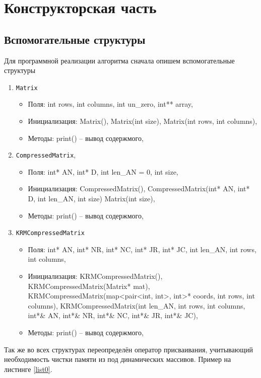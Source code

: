 \chapter{Конструкторская часть}

\section{Вспомогательные структуры} 
Для программной реализации алгоритма сначала опишем вспомогательные структуры
\begin{enumerate}
	\item \texttt{Matrix}
	\begin{itemize}
		\item Поля: int rows, int columns, int un\_zero, int** array,
		\item Инициализация: Matrix(), Matrix(int size), Matrix(int rows, int columns),
		\item Методы: print() -- вывод содержмого,
	\end{itemize}
	
	\item \texttt{CompressedMatrix},
	\begin{itemize}
		\item Поля: int* AN, int* D, int len\_AN = 0, int size,
		\item Инициализация: CompressedMatrix(), CompressedMatrix(int* AN, int* D, int len\_AN, int size) Matrix(int size),
		\item Методы: print() -- вывод содержмого,
	\end{itemize}
	
	\item \texttt{KRMCompressedMatrix}
	\begin{itemize}
		\item Поля: int* AN, int* NR, int* NC, int* JR, int* JC, int len\_AN, int rows, int columns,
		\item Инициализация: KRMCompressedMatrix(), KRMCompressedMatrix(Matrix* mat), KRMCompressedMatrix(map<pair<int, int>, int>* coords, int rows, int columns), KRMCompressedMatrix(int len\_AN, int rows, int columns, int*\& AN, int*\& NR, int*\& NC, int*\& JR, int*\& JC),
		\item Методы: print() -- вывод содержмого,
	\end{itemize}
\end{enumerate}
Так же во всех структурах переопределён оператор присваивания, учитывающий необходимость чистки памяти из под динамических массивов. Пример на листинге \ref{list0}.
